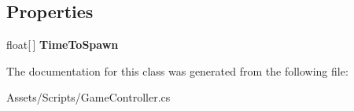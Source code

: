 \subsection*{Properties}
\begin{DoxyCompactItemize}
\item 
\hypertarget{class_game_controller_a673c0662bae48eccd1b3b8e498e00ec6}{}float\mbox{[}$\,$\mbox{]} {\bfseries Time\+To\+Spawn}\label{class_game_controller_a673c0662bae48eccd1b3b8e498e00ec6}

\end{DoxyCompactItemize}


The documentation for this class was generated from the following file\+:\begin{DoxyCompactItemize}
\item 
Assets/\+Scripts/Game\+Controller.\+cs\end{DoxyCompactItemize}
